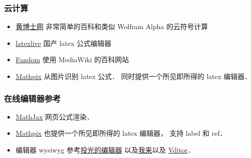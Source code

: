 \subsubsection{云计算}
\begin{itemize}
\item \href{http://www.drhuang.com/}{黄博士网} 非常简单的百科和类似 Wolfram Alpha 的云符号计算
\item \href{https://www.latexlive.com/}{latexlive} 国产 latex 公式编辑器
\item \href{https://harrypotter.fandom.com}{Fandom} 使用 MediaWiki 的百科网站
\item \href{https://mathpix.com}{Mathpix} 从图片识别 latex 公式． 同时提供一个所见即所得的 latex 编辑器．
\end{itemize}

\subsubsection{在线编辑器参考}
\begin{itemize}
\item \href{https://www.mathjax.org/}{MathJax} 网页公式渲染．
\item \href{https://mathpix.com/ocr?gclid=CjwKCAiAy_CcBhBeEiwAcoMRHKnSPGjROmFGBj5R_Ev3hke7lG7xNIzKDHv5FgkMFq62aXRpISt_LhoC47YQAvD_BwE}{Mathpix} 也提供一个所见即所得的 latex 编辑器， 支持 label 和 ref．
\item 编辑器 wysiwyg 参考\href{https://editoe.com/}{投光的编辑器} 以及\href{https://www.wolai.com/}{我来}以及 \href{https://github.com/Vanessa219/vditor}{Vditor}．
\end{itemize}

